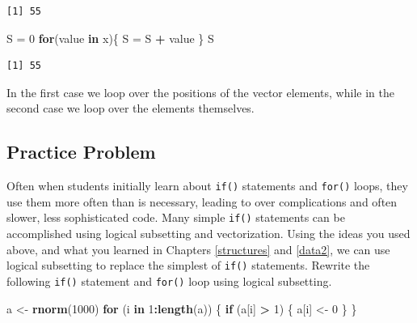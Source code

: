 \documentclass[
]{krantz}
\makeatletter
\newenvironment{Shaded}{\begin{snugshade}}{\end{snugshade}}
\newcommand{\ControlFlowTok}[1]{\textcolor[rgb]{0.27,0.27,0.27}{\textbf{#1}}}
\newcommand{\DecValTok}[1]{\textcolor[rgb]{0.06,0.06,0.06}{#1}}
\newcommand{\KeywordTok}[1]{\textcolor[rgb]{0.27,0.27,0.27}{\textbf{#1}}}
\newcommand{\NormalTok}[1]{#1}
\newcommand{\OperatorTok}[1]{\textcolor[rgb]{0.43,0.43,0.43}{\textbf{#1}}}
\newcommand{\StringTok}[1]{\textcolor[rgb]{0.5,0.5,0.5}{#1}}
\newenvironment{kframe}{%
\medskip{}
\setlength{\fboxsep}{.8em}
 \def\at@end@of@kframe{}%
 \ifinner\ifhmode%
  \def\at@end@of@kframe{\end{minipage}}%
  \begin{minipage}{\columnwidth}%
 \fi\fi%
 \def\FrameCommand##1{\hskip\@totalleftmargin \hskip-\fboxsep
 \colorbox{shadecolor}{##1}\hskip-\fboxsep
     \hskip-\linewidth \hskip-\@totalleftmargin \hskip\columnwidth}%
 \MakeFramed {\advance\hsize-\width
   \@totalleftmargin\z@ \linewidth\hsize
   \@setminipage}}%
 {\par\unskip\endMakeFramed%
 \at@end@of@kframe}
\renewenvironment{Shaded}{\begin{kframe}}{\end{kframe}}
\makeatother
\begin{document}
\begin{verbatim}
[1] 55
\end{verbatim}

\begin{Shaded}
\begin{Highlighting}[]
\NormalTok{S =}\StringTok{ }\DecValTok{0}
\ControlFlowTok{for}\NormalTok{(value }\ControlFlowTok{in}\NormalTok{ x)\{}
\NormalTok{  S =}\StringTok{ }\NormalTok{S }\OperatorTok{+}\StringTok{ }\NormalTok{value}
\NormalTok{\}}
\NormalTok{S}
\end{Highlighting}
\end{Shaded}

\begin{verbatim}
[1] 55
\end{verbatim}

In the first case we loop over the positions of the vector elements, while in the second case we loop over the elements themselves.

\hypertarget{ch7PP2}{%
\subsection{Practice Problem}\label{ch7PP2}}

Often when students initially learn about \texttt{if()} statements and \texttt{for()} loops, they use them more often than is necessary, leading to over complications and often slower, less sophisticated code. Many simple \texttt{if()} statements can be accomplished using logical subsetting and vectorization. Using the ideas you used above, and what you learned in Chapters \ref{structures} and \ref{data2}, we can use logical subsetting to replace the simplest of \texttt{if()} statements. Rewrite the following \texttt{if()} statement and \texttt{for()} loop using logical subsetting.

\begin{Shaded}
\begin{Highlighting}[]
\NormalTok{a \textless{}{-}}\StringTok{ }\KeywordTok{rnorm}\NormalTok{(}\DecValTok{1000}\NormalTok{)}
\ControlFlowTok{for}\NormalTok{ (i }\ControlFlowTok{in} \DecValTok{1}\OperatorTok{:}\KeywordTok{length}\NormalTok{(a)) \{}
  \ControlFlowTok{if}\NormalTok{ (a[i] }\OperatorTok{\textgreater{}}\StringTok{ }\DecValTok{1}\NormalTok{) \{}
\NormalTok{    a[i] \textless{}{-}}\StringTok{ }\DecValTok{0}
\NormalTok{  \}}
\NormalTok{\}}
\end{Highlighting}
\end{Shaded}
\end{document}
